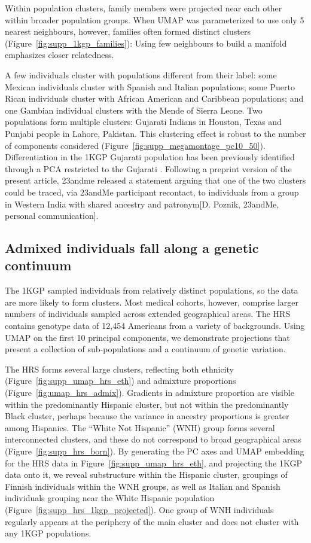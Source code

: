 Within population clusters, family members were projected near each other within broader population groups. When UMAP was parameterized to use only 5 nearest neighbours, however, families often formed distinct clusters (Figure~\ref{fig:supp_1kgp_families}): Using few neighbours to build a manifold emphasizes closer relatedness.

A few individuals cluster with populations different from their label: some Mexican individuals cluster with Spanish and Italian populations; some Puerto Rican individuals cluster with African American and Caribbean populations; and one Gambian individual clusters with the Mende of Sierra Leone. Two populations form multiple clusters: Gujarati Indians in Houston, Texas and Punjabi people in Lahore, Pakistan. This clustering effect is robust to the number of components considered (Figure~\ref{fig:supp_megamontage_pc10_50}). Differentiation in the 1KGP Gujarati population has been previously identified through a PCA restricted to the Gujarati \citep{reich2009india}. Following a preprint version of the present article, 23andme released a statement \citep{23andme} arguing that one of the two clusters could be traced, via 23andMe participant recontact, to individuals from a group in Western India with shared ancestry and patronym[D. Poznik, 23andMe, personal communication]\citep{23andme}.

\subsection{Admixed individuals fall along a genetic continuum}
The 1KGP sampled individuals from relatively distinct populations, so the data are more likely to form clusters. Most medical cohorts, however, comprise larger numbers of individuals sampled across extended geographical areas. The HRS contains genotype data of 12,454 Americans from a variety of backgrounds. Using UMAP on the first 10 principal components, we demonstrate projections that present a collection of sub-populations and a continuum of genetic variation.

The HRS forms several large clusters, reflecting both ethnicity (Figure~\ref{fig:supp_umap_hrs_eth}) and admixture proportions (Figure~\ref{fig:umap_hrs_admix}). Gradients in admixture proportion are visible within the predominantly Hispanic cluster, but not within the predominantly Black cluster, perhaps because the variance in ancestry proportions is greater among Hispanics. The ``White Not Hispanic'' (WNH) group forms several interconnected clusters, and these do not correspond to broad geographical areas (Figure~\ref{fig:supp_hrs_born}). By generating the PC axes and UMAP embedding for the HRS data in Figure~\ref{fig:supp_umap_hrs_eth}, and projecting the 1KGP data onto it, we reveal substructure within the Hispanic cluster, groupings of Finnish individuals within the WNH groups, as well as Italian and Spanish individuals grouping near the White Hispanic population (Figure~\ref{fig:supp_hrs_1kgp_projected}). One group of WNH individuals regularly appears at the periphery of the main cluster and does not cluster with any 1KGP populations.

